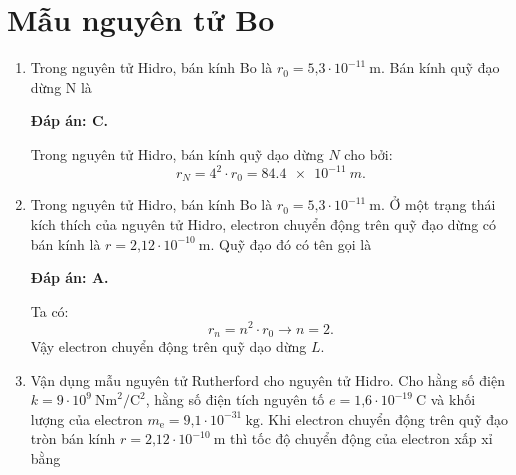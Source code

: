 \section{Mẫu nguyên tử Bo}
\begin{enumerate}[label=\bfseries Câu \arabic*:]
	\item {} 
	
	\cauhoi
	{Trong nguyên tử Hidro, bán kính Bo là $r_0=\text{5,3}\cdot 10^{-11}\ \text{m}$. Bán kính quỹ đạo dừng N là
	}
	
	\loigiai
	{		\textbf{Đáp án: C.}
		
Trong nguyên tử Hidro, bán kính quỹ dạo dừng $ N $ cho bởi:
$$
	r_{N} = 4^{2} \cdot r_{0} = \SI{84,4 e-11}{m}.
$$
		
	}
	
	\item {} 
	
	\cauhoi
	{Trong nguyên tử Hidro, bán kính Bo là $r_0=\text{5,3}\cdot 10^{-11}\ \text{m}$.   Ở một trạng thái kích thích của nguyên tử Hidro, electron chuyển động trên quỹ đạo dừng có bán kính là $r=\text{2,12}\cdot 10^{-10}\ \text{m}$.   Quỹ đạo đó có tên gọi là 
	}
	
	\loigiai
	{		\textbf{Đáp án: A.}
		
Ta có:
$$
	r_{n} = n^{2} \cdot r_{0} \rightarrow n = \num{2}.
$$
Vậy electron chuyển động trên quỹ dạo dừng $ L $.
		
	}
	
	\item {} 
	
	\cauhoi
	{Vận dụng mẫu nguyên tử Rutherford cho nguyên tử Hidro. Cho hằng số điện $k=9\cdot 10^9\ \text{Nm}^2/\text{C}^2$, hằng số điện tích nguyên tố $e=\text{1,6}\cdot 10^{-19}\ \text{C}$ và khối lượng của electron $m_\text{e}=\text{9,1}\cdot 10^{-31}\ \text{kg}$. Khi electron chuyển động trên quỹ đạo tròn bán kính $r = \text{2,12} \cdot 10^{-10}\ \text{m}$ thì tốc độ chuyển động của electron xấp xỉ bằng
	}
	

\end{enumerate}
